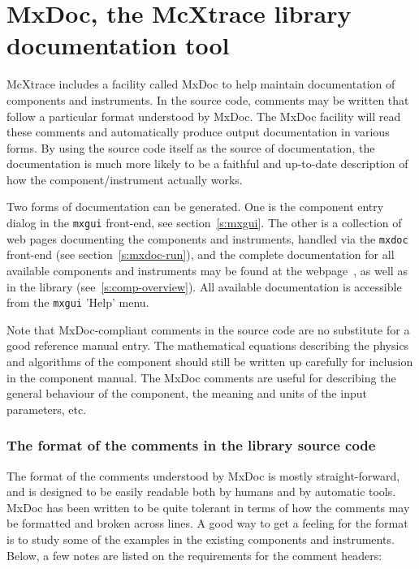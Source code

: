 \section{MxDoc, the McXtrace library documentation tool}
\label{s:mxdoc}

McXtrace includes a facility called MxDoc to help maintain documentation of
components and instruments. In the source code, comments may be
written that follow a particular format understood by MxDoc. The MxDoc facility
will read these comments and automatically produce output documentation in
various forms. By using the source code itself as the source of documentation,
the documentation is much more likely to be a faithful and up-to-date
description of how the component/instrument actually works.

Two forms of documentation can be generated. One
is the component entry dialog in the \verb+mxgui+ front-end, see
section~\ref{s:mxgui}. The other is a collection of web pages documenting
the components and instruments, handled via the \verb+mxdoc+ front-end (see section~\ref{s:mxdoc-run}), and the complete documentation for all available
\MCX components and instruments may be found at the \MCX
webpage~\cite{mcxtrace_webpage}, as well as in the \MCX library
(see~\ref{s:comp-overview}). All available \MCX documentation is accessible from the \verb+mxgui+ 'Help' menu.

Note that MxDoc-compliant comments in the source code are no substitute
for a good reference manual entry. The mathematical equations describing
the physics and algorithms of the component should still be written up
carefully for inclusion in the component manual. The MxDoc comments are
useful for describing the general behaviour of the component, the
meaning and units of the input parameters, etc.


\subsubsection{The format of the comments in the library source code}

The format of the comments understood by MxDoc is mostly
straight-forward, and is designed to be easily readable both by humans
and by automatic tools. MxDoc has been written to be quite tolerant in
terms of how the comments may be formatted and broken across lines. A
good way to get a feeling for the format is to study some of the examples
in the existing components and instruments. Below, a few
notes are listed on the requirements for the comment headers:

